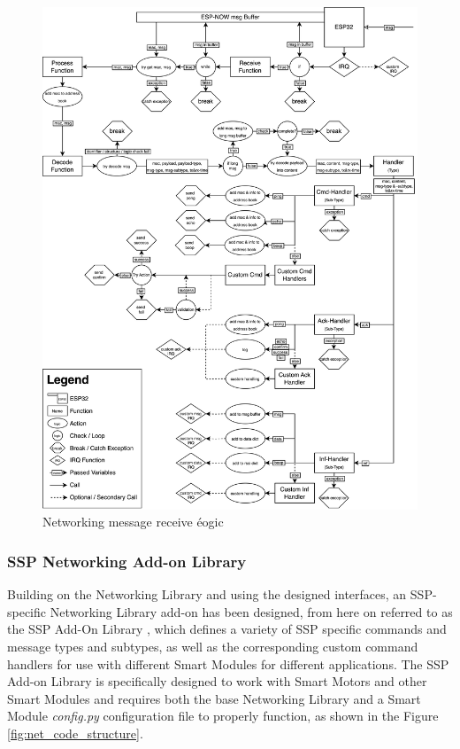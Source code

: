 \begin{figure}[H]
    \centering
    \includegraphics[width=\linewidth]{overleaf/images/receive_logic.drawio.png}
    \vspace{\ftspace}
    \caption{Networking message receive éogic}
    \label{fig:net_recv_logic}
\end{figure}


\subsubsection{\label{sec:methods_ssp_networking}SSP Networking Add-on Library}

Building on the Networking Library and using the designed interfaces, an SSP-specific Networking Library add-on has been designed, from here on referred to as the SSP Add-On Library , which defines a variety of SSP specific commands and message types and subtypes, as well as the corresponding custom command handlers for use with different Smart Modules for different applications. The SSP Add-on Library is specifically designed to work with Smart Motors and other Smart Modules and requires both the base Networking Library and a Smart Module \textit{config.py} configuration file to properly function, as shown in the Figure \ref{fig:net_code_structure}.

